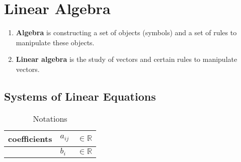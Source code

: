 \chapter{Linear Algebra}

\begin{enumerate}
    \item \textbf{Algebra} is constructing a set of objects (symbols) and a set of rules to manipulate these objects.
    \hfill \cite{mfml/book/mml/Deisenroth-Faisal-Ong}

    \item \textbf{Linear algebra} is the study of vectors and certain rules to manipulate vectors.
    \hfill \cite{mfml/book/mml/Deisenroth-Faisal-Ong}
\end{enumerate}


\section{Systems of Linear Equations}

\begin{customArrayStretch}{1.3}
\begin{table}[H]
    \centering
    \begin{tabular}{| l | l  l |}
        \hline
        
        coefficients & $a_{ij}$    & $\in \mathbb{R}$ \\ \hline
        
         & $b_{i}$     & $\in \mathbb{R}$ \\ \hline
    \end{tabular}
    \caption*{Notations}
\end{table}
\end{customArrayStretch}


\vspace{0.5cm}


